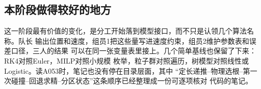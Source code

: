 \subsection{本阶段做得较好的地方}

这一阶段最有价值的变化，是分工开始落到模型接口，而不只是认领几个算法名称。队长
输出位置和速度，组员1把这些量写进速度约束，组员2维护参数表和误差口径，三人的结果
可以在同一张变量表里接上。几个简单基线也保留了下来：RK4对照Euler，MILP对照小规模
枚举，粒子群对照遍历，树模型对照线性或Logistic。读A053时，笔记也没有停在目录层面，其中
“定长递推--物理选根--第一次碰撞--回退求精--分区状态”这条顺序已经整理成一份可逐项核对
代码的笔记。

